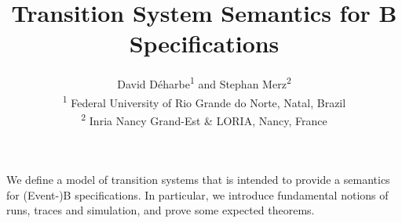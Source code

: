 \documentclass[11pt,a4paper]{article}
\begin{document}
\title{
  Transition System Semantics for B Specifications
}
\author{
  David D\'eharbe\textsuperscript{1} and Stephan Merz\textsuperscript{2}\\
  \mbox{}\textsuperscript{1} Federal University of Rio Grande do Norte, Natal, Brazil\\
  \mbox{}\textsuperscript{2} Inria Nancy Grand-Est \& LORIA, Nancy, France\\
}
\maketitle

We define a model of transition systems that is intended to provide a semantics for
(Event-)B specifications. In particular, we introduce fundamental notions of runs,
traces and simulation, and prove some expected theorems.

\tableofcontents




%
%
\end{document}
